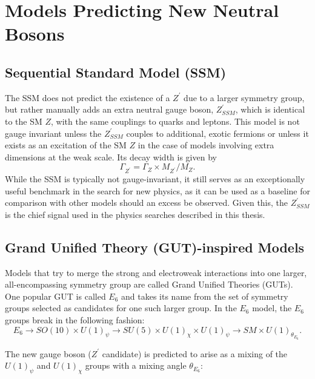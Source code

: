 \section{Models Predicting New Neutral Bosons}

\subsection{Sequential Standard Model (SSM)}

The SSM does not predict the existence of a $Z^{\prime}$ due to a larger symmetry group, but rather manually adds an extra neutral gauge boson, $Z^{\prime}_{SSM}$, which is identical to the SM $Z$, with the same couplings to quarks and leptons. This model is not gauge invariant unless the $Z^{\prime}_{SSM}$ couples to additional, exotic fermions or unless it exists as an excitation of the SM $Z$ in the case of models involving extra dimensions at the weak scale. Its decay width is given by 
\begin{equation}
\Gamma_{Z^{\prime}} = \Gamma_Z \times M_{Z^{\prime}}/M_{Z}.
\end{equation}
\noindent While the SSM is typically not gauge-invariant, it still serves as an exceptionally useful benchmark in the search for new physics, as it can be used as a baseline for comparison with other models should an excess be observed.\cite{SSM} Given this, the $Z^{\prime}_{SSM}$ is the chief signal used in the physics searches described in this thesis.

\subsection{Grand Unified Theory (GUT)-inspired Models}

Models that try to merge the strong and electroweak interactions into one larger, all-encompassing symmetry group are called Grand Unified Theories (GUTs). One popular GUT is called $E_6$ and takes its name from the set of symmetry groups selected as candidates for one such larger group. In the $E_6$ model, the $E_6$ groups break in the following fashion:
\begin{equation}
E_6 \to SO(10) \times U(1)_\psi \to SU(5) \times U(1)_\chi \times U(1)_\psi \to SM \times U(1)_{\theta_{E_6}}.
\end{equation}

\noindent The new gauge boson ($Z^\prime$ candidate) is predicted to arise as a mixing of the $U(1)_\psi$ and $U(1)_\chi$ groups with a mixing angle $\theta_{E_6}$:

